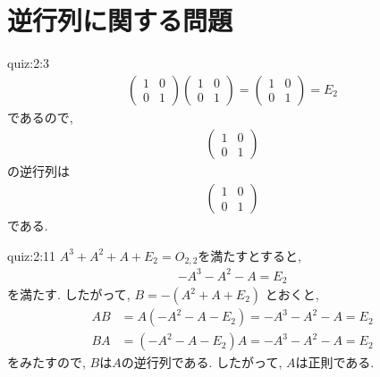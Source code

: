 \section{逆行列に関する問題}

\begin{answerof}{quiz:2:3}
  \begin{align*}
    \begin{pmatrix}
      1&0\\0&1
    \end{pmatrix}
    \begin{pmatrix}
      1&0\\0&1
    \end{pmatrix}=
    \begin{pmatrix}
      1&0\\0&1
    \end{pmatrix}
    =E_2
  \end{align*}
  であるので,
  \begin{align*}
      \begin{pmatrix}
      1&0\\0&1
    \end{pmatrix}
  \end{align*}
  の逆行列は
  \begin{align*}
      \begin{pmatrix}
      1&0\\0&1
    \end{pmatrix}
  \end{align*}
  である.
\end{answerof}

\begin{answerof}{quiz:2:11}
  $A^3+A^2+A+E_2=O_{2,2}$を満たすとすると,
  \begin{align*}
    -A^3-A^2-A=E_2
  \end{align*}
  を満たす.
  したがって, $B=-(A^2+A+E_2)$
  とおくと,
  \begin{align*}
  AB&=A(-A^2-A-E_2)=-A^3-A^2-A=E_2\\
  BA&=(-A^2-A-E_2)A=-A^3-A^2-A=E_2
  \end{align*}
  をみたすので,
  $B$は$A$の逆行列である.
  したがって, $A$は正則である.
\end{answerof}


